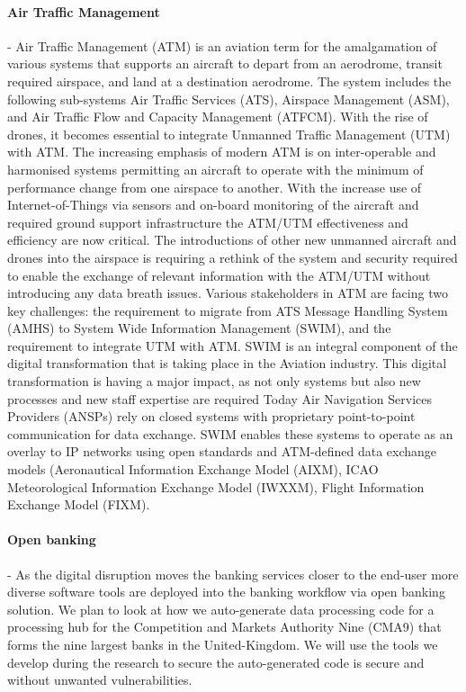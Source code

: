 \documentclass[a4paper,11pt]{article}
\begin{document}
\paragraph{Air Traffic Management}
\label{sec:atm}
- Air Traffic Management (ATM) is an aviation term for the amalgamation of various systems that supports an aircraft to depart from an aerodrome, transit required airspace, and land at a destination aerodrome. The system includes the following sub-systems Air Traffic Services (ATS), Airspace Management (ASM), and Air Traffic Flow and Capacity Management (ATFCM). With the rise of drones, it becomes essential to integrate Unmanned Traffic Management (UTM) with ATM. The increasing emphasis of modern ATM is on inter-operable and harmonised systems permitting an aircraft to operate with the minimum of performance change from one airspace to another. With the increase use of Internet-of-Things via sensors and on-board monitoring of the aircraft and required ground support infrastructure the ATM/UTM effectiveness and efficiency are now critical. The introductions of other new unmanned aircraft and drones into the airspace is requiring a rethink of the system and security required to enable the exchange of relevant information with the ATM/UTM without introducing any data breath issues. 
Various stakeholders in ATM are facing two key challenges: the requirement to migrate from ATS Message Handling System (AMHS) to System Wide Information Management (SWIM), and the requirement to integrate UTM with ATM. SWIM is an integral component of the digital transformation that is taking place in the Aviation industry. This digital transformation is having a major impact, as not only systems but also new processes and new staff expertise are required Today Air Navigation Services Providers (ANSPs) rely on closed systems with proprietary point-to-point communication for data exchange. SWIM enables these systems to operate as an overlay to IP networks using open standards and ATM-defined data exchange models (Aeronautical Information Exchange Model (AIXM), ICAO Meteorological Information Exchange Model (IWXXM), Flight Information Exchange Model (FIXM). 

\paragraph{Open banking}
\label{sec:banking}
- As the digital disruption moves the banking services closer to the end-user more diverse software tools are deployed into the banking workflow via open banking solution. We plan to look at how we auto-generate data processing code for a processing hub for the Competition and Markets Authority Nine (CMA9) that forms the nine largest banks in the United-Kingdom. We will use the tools we develop during the research to secure the auto-generated code is secure and without unwanted vulnerabilities.
\end{document}

